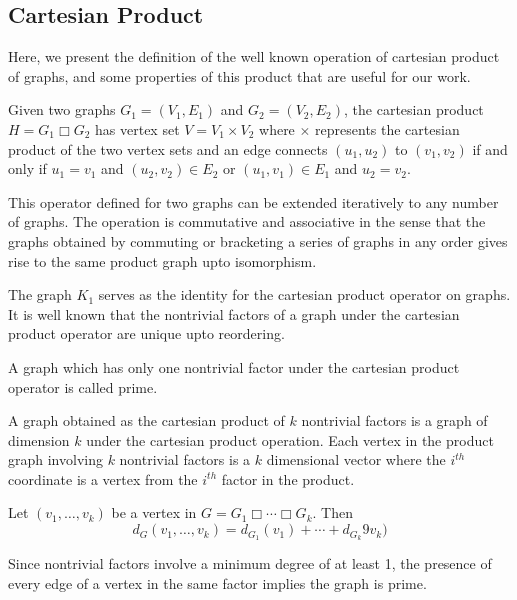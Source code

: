 \documentclass{llncs}
\begin{document}
\subsection{Cartesian Product}
Here, we present the definition of the well known operation of cartesian product of graphs, and some properties of this product that are useful for our work.
\begin{definition}
	Given two graphs $G_1=(V_1,E_1)$ and $G_2=(V_2,E_2)$, the cartesian product $H=G_1\Box G_2$ has vertex set $V=V_1\times V_2$ where $\times$ represents the cartesian product of the two vertex sets and an edge connects $(u_1,u_2)$ to $(v_1,v_2)$ if and only if $u_1=v_1$ and $(u_2,v_2)\in E_2$ or $(u_1,v_1)\in E_1$ and $u_2=v_2$.
\end{definition}

This operator defined for two graphs can be extended iteratively to any number of graphs. The operation is commutative and associative in the sense that the graphs obtained by commuting or bracketing a series of graphs in any order gives rise to the same product graph upto isomorphism. 

The graph $K_1$ serves as the identity for the cartesian product operator on graphs. It is well known that the nontrivial factors of a graph under the cartesian product operator are unique upto reordering.

\begin{definition}
	A graph which has only one nontrivial factor under the cartesian product operator is called prime. 
\end{definition}

A graph obtained as the cartesian product of $k$ nontrivial factors \cite{imrich2007recognizing} \cite{imrich1994factoring} is a graph of dimension $k$ under the cartesian product operation. Each vertex in the product graph involving $k$ nontrivial factors is a $k$ dimensional vector where the $i^{th}$ coordinate is a vertex from the $i^{th}$ factor in the product. 

\begin{lemma}
	Let $(v_1,\ldots,v_k)$ be a vertex in $G=G_1\Box\cdots\Box G_k$. Then \[d_G(v_1,\ldots,v_k)=d_{G_1}(v_1)+\cdots+d_{G_k}9v_k)\]
\end{lemma} 

\begin{lemma} \label{prime}
	Since nontrivial factors involve a minimum degree of at least 1, the presence of every edge of a vertex in the same factor implies the graph is prime.
\end{lemma}
\end{document}
